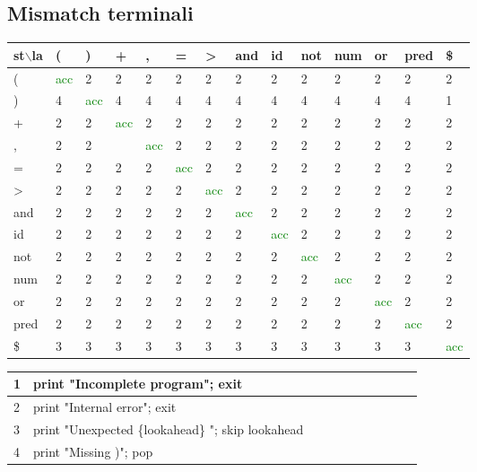 \documentclass[11pt, a4paper]{article}
\begin{document}
\subsection{Mismatch terminali}

\begin{table}[!ht]
    \centering
    \begin{tabular}{|l|l|l|l|l|l|l|l|l|l|l|l|l|l|}
    \hline
        st$\backslash$la & ( & ) & + & , & = & > & and & id & not & num & or & pred & \$ \\ \hline
        ( & \textcolor{green}{acc} & 2 & 2 & 2 & 2 & 2 & 2 & 2 & 2 & 2 & 2 & 2 & 2 \\ \hline
        ) & 4 & \textcolor{green}{acc} & 4 & 4 & 4 & 4 & 4 & 4 & 4 & 4 & 4 & 4 & 1 \\ \hline
        + & 2 & 2 & \textcolor{green}{acc} & 2 & 2 & 2 & 2 & 2 & 2 & 2 & 2 & 2 & 2 \\ \hline
        , & 2 & 2 & ~ & \textcolor{green}{acc} & 2 & 2 & 2 & 2 & 2 & 2 & 2 & 2 & 2 \\ \hline
        = & 2 & 2 & 2 & 2 & \textcolor{green}{acc} & 2 & 2 & 2 & 2 & 2 & 2 & 2 & 2 \\ \hline
        > & 2 & 2 & 2 & 2 & 2 & \textcolor{green}{acc} & 2 & 2 & 2 & 2 & 2 & 2 & 2 \\ \hline
        and & 2 & 2 & 2 & 2 & 2 & 2 & \textcolor{green}{acc} & 2 & 2 & 2 & 2 & 2 & 2 \\ \hline
        id & 2 & 2 & 2 & 2 & 2 & 2 & 2 & \textcolor{green}{acc} & 2 & 2 & 2 & 2 & 2 \\ \hline
        not & 2 & 2 & 2 & 2 & 2 & 2 & 2 & 2 & \textcolor{green}{acc} & 2 & 2 & 2 & 2 \\ \hline
        num & 2 & 2 & 2 & 2 & 2 & 2 & 2 & 2 & 2 & \textcolor{green}{acc} & 2 & 2 & 2 \\ \hline
        or & 2 & 2 & 2 & 2 & 2 & 2 & 2 & 2 & 2 & 2 & \textcolor{green}{acc} & 2 & 2 \\ \hline
        pred & 2 & 2 & 2 & 2 & 2 & 2 & 2 & 2 & 2 & 2 & 2 & \textcolor{green}{acc} & 2 \\ \hline
        \$ & 3 & 3 & 3 & 3 & 3 & 3 & 3 & 3 & 3 & 3 & 3 & 3 & \textcolor{green}{acc} \\ \hline
    \end{tabular}
\end{table}

\begin{table}[!ht]
    \centering
    \begin{tabular}{|l|l|l|l|l|l|l|l|l|l|}
    \hline
        1 & print "Incomplete program"; exit & ~ \\ \hline
        2 & print "Internal error"; exit & ~ \\ \hline
        3 & print "Unexpected \{lookahead\} "; skip lookahead & ~ \\ \hline
        4 & print "Missing )"; pop \\ \hline
    \end{tabular}
\end{table}
\end{document}

